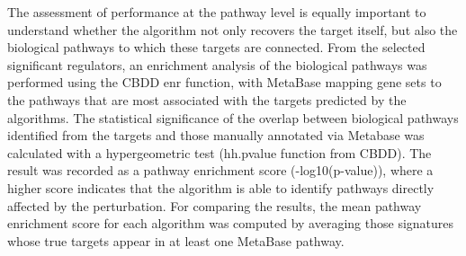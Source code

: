 The assessment of performance at the pathway level is equally important to understand whether the algorithm not only recovers the target itself, but also the biological pathways to which these targets are connected. From the selected significant regulators, an enrichment analysis of the biological pathways was performed using the CBDD enr function, with MetaBase mapping gene sets to the pathways that are most associated with the targets predicted by the algorithms. The statistical significance of the overlap between biological pathways identified from the targets and those manually annotated via Metabase was calculated with a hypergeometric test (hh.pvalue function from CBDD). The result was recorded as a pathway enrichment score (-log10(p-value)), where a higher score indicates that the algorithm is able to identify pathways directly affected by the perturbation. For comparing the results, the mean pathway enrichment score for each algorithm was computed by averaging those signatures whose true targets appear in at least one MetaBase pathway. 


